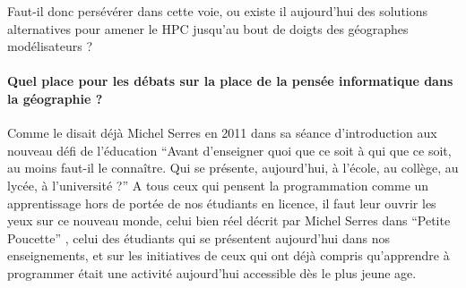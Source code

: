 Faut-il donc persévérer dans cette voie, ou existe il aujourd'hui des solutions alternatives pour amener le HPC jusqu'au bout de doigts des géographes modélisateurs ?







\paragraph{Quel place pour les débats sur la place de la pensée informatique dans la géographie ?}
\label{p:Tournantenseignements}

Comme le disait déjà Michel Serres en 2011 dans sa séance d'introduction aux nouveau défi de l'éducation \enquote{Avant d’enseigner quoi que ce soit à qui que ce soit, au moins faut-il le connaître. Qui se présente, aujourd’hui, à l’école, au collège, au lycée, à l’université ?} \autocite{Serres2011} A tous ceux qui pensent la programmation comme un apprentissage hors de portée de nos étudiants en licence, il faut leur ouvrir les yeux sur ce nouveau monde, celui bien réel décrit par Michel Serres dans \enquote{Petite Poucette} \autocite{Serres2012}, celui des étudiants qui se présentent aujourd'hui dans nos enseignements, et sur les initiatives de ceux qui ont déjà compris qu'apprendre à programmer était une activité aujourd'hui accessible dès le plus jeune age.

